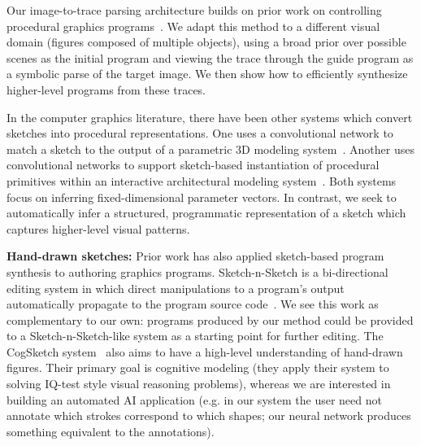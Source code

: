 \documentclass{article}
\theoremstyle{definition}
\begin{document}
Our image-to-trace parsing architecture builds on prior work on controlling procedural graphics programs~\citep{ritchie2016neurally}.
We adapt this method to a different visual domain (figures composed of multiple objects), using a broad prior over possible scenes as the initial program and viewing the trace through the guide program as a symbolic parse of the target image.
We then show how to efficiently synthesize higher-level programs from these traces.

In the computer graphics literature, there have been other systems which convert sketches into procedural representations. One uses a convolutional network to match a sketch to the output of a parametric 3D modeling system~\citep{huang2017shape}. Another uses convolutional networks to support sketch-based instantiation of procedural primitives within an interactive architectural modeling system~\citep{Nishida:2016:ISU:2897824.2925951}. Both systems focus on inferring fixed-dimensional parameter vectors. In contrast, we seek to automatically infer a structured, programmatic representation of a sketch which captures higher-level visual patterns.

\textbf{Hand-drawn sketches:} Prior work has also applied sketch-based program synthesis to authoring graphics programs. Sketch-n-Sketch is a bi-directional editing system in which direct manipulations to a program's output automatically propagate to the program source code~\citep{Hempel:2016:SSP:2984511.2984575}. We see this work as complementary to our own: programs produced by our method could be provided to a Sketch-n-Sketch-like system as a starting point for further editing.
The CogSketch system~\citep{forbus2011cogsketch} also aims to have a
high-level understanding of hand-drawn figures. Their primary goal is
cognitive modeling (they apply their system to solving IQ-test
style visual reasoning problems), whereas we are interested in
building an automated AI application (e.g. in our system the user need
not annotate which strokes correspond to which shapes; our neural
network produces something equivalent to the annotations).
\end{document}
